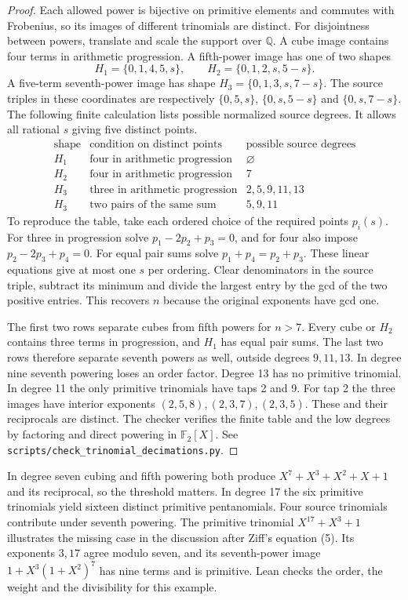 \documentclass[11pt]{article}
\newcommand{\F}{\mathbb F_2}
\begin{document}
\begin{proof}
Each allowed power is bijective on primitive elements and commutes
with Frobenius, so its images of different trinomials are distinct.
For disjointness between powers, translate and scale the support
over \(\mathbb Q\). A cube image contains four terms in arithmetic
progression. A fifth-power image has one of two shapes
\[
   H_1=\{0,1,4,5,s\},\qquad H_2=\{0,1,2,s,5-s\}.
\]
A five-term seventh-power image has shape \(H_3=\{0,1,3,s,7-s\}\).
The source triples in these coordinates are respectively
\(\{0,5,s\}\), \(\{0,s,5-s\}\) and \(\{0,s,7-s\}\).
The following finite calculation lists possible normalized source
degrees. It allows all rational \(s\) giving five distinct points.
\[
\begin{array}{c|l|l}
 \text{shape}&\text{condition on distinct points}&
          \text{possible source degrees}\\\hline
 H_1&\text{four in arithmetic progression}&\varnothing\\
 H_2&\text{four in arithmetic progression}&7\\
 H_3&\text{three in arithmetic progression}&2,5,9,11,13\\
 H_3&\text{two pairs of the same sum}&5,9,11
\end{array}
\]
To reproduce the table, take each ordered choice of the required
points \(p_i(s)\). For three in progression solve
\(p_1-2p_2+p_3=0\), and for four also impose \(p_2-2p_3+p_4=0\).
For equal pair sums solve \(p_1+p_4=p_2+p_3\). These linear
equations give at most one \(s\) per ordering. Clear denominators
in the source triple, subtract its minimum and divide the largest
entry by the gcd of the two positive entries. This recovers \(n\)
because the original exponents have gcd one.

The first two rows separate cubes from fifth powers for \(n>7\).
Every cube or \(H_2\) contains three terms in progression, and \(H_1\)
has equal pair sums. The last two rows therefore separate seventh
powers as well, outside degrees \(9,11,13\). In degree nine seventh
powering loses an order factor. Degree 13 has no primitive trinomial.
In degree 11 the only primitive trinomials have taps 2 and 9. For
tap 2 the three images have interior exponents
\((2,5,8),(2,3,7),(2,3,5)\). These and their reciprocals are distinct.
The checker verifies the finite table and the low degrees by
factoring and direct powering in \(\F[X]\).
See \nolinkurl{scripts/check_trinomial_decimations.py}.
\end{proof}
In degree seven cubing and fifth powering both produce
\(X^7+X^3+X^2+X+1\) and its reciprocal, so the threshold matters.
In degree 17 the six primitive trinomials yield sixteen distinct
primitive pentanomials. Four source trinomials contribute under
seventh powering. The primitive trinomial \(X^{17}+X^3+1\) illustrates
the missing case in the discussion after Ziff's equation (5).
Its exponents \(3,17\) agree modulo seven, and its seventh-power
image \(1+X^3(1+X^2)^7\) has nine terms and is primitive.
Lean checks the order, the weight and the divisibility for this example.
\end{document}
